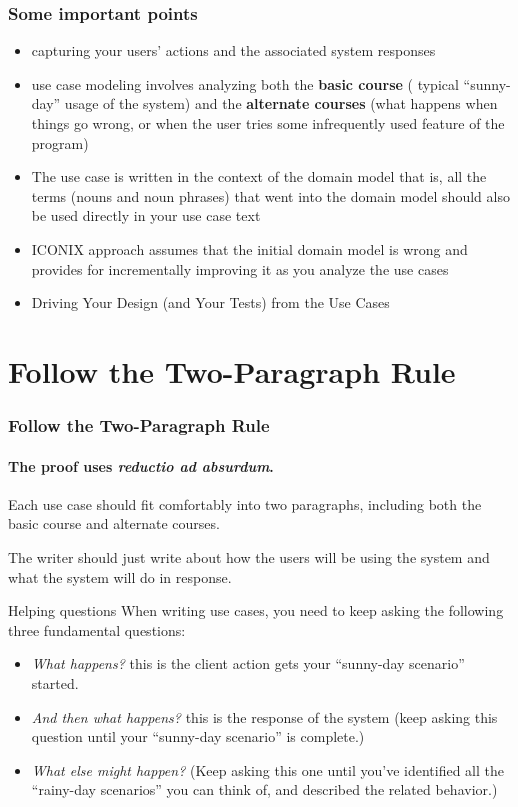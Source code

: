\documentclass{beamer}
\begin{document}
\frame
{ 
  \frametitle{Some important points}
  
  \begin{itemize}
  \item capturing your users’ actions and the associated system responses
  \item use case modeling involves analyzing both the \textbf{basic course} (
	typical “sunny-day” usage of the system) and the \textbf{alternate
	courses} (what happens when things go wrong, or when the user tries some
	infrequently used feature of the program)

  \item The use case is written in the context of the domain model that is, all
  	the terms (nouns and noun phrases) that went into the domain model should
  also be used directly in your use case text 
  \item  ICONIX approach assumes that the initial domain model is wrong and
  provides for incrementally improving it as you analyze the use cases
  \item Driving Your Design (and Your Tests) from the Use Cases
  
  \end{itemize}
}

\section{Follow the Two-Paragraph Rule}

\begin{frame}
  \frametitle{Follow the Two-Paragraph Rule}
  \framesubtitle{The proof uses \textit{reductio ad absurdum}.}
  Each use case should fit comfortably into two paragraphs, including both the 
  basic course and alternate courses.
  
  The writer should just write about how the users will be using the system and
 	what the system will do in response.
 	
 	\begin{block}{Helping questions}
 When writing use cases, you need to keep asking the following three
 fundamental questions:
		\begin{itemize} 
		  \item \emph{What happens?} this is the client action gets your
		  “sunny-day scenario” started.
		  \item \emph{And then what happens?} this is the response of the system 
			(keep asking this question until your “sunny-day scenario” is complete.)
		  \item \emph{What else might happen?} (Keep asking this one until you’ve 
		  	identified all the “rainy-day scenarios” you can think of, and
		  	 described the related behavior.)
		\end{itemize}    
     \end{block}
\end{frame}
\end{document}
